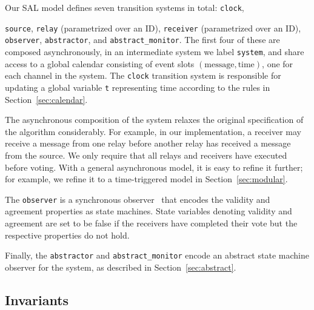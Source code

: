 \documentclass{llncs/llncs}
\begin{document}
Our SAL model defines seven transition systems in total: \texttt{clock}, {\texttt{source}, \texttt{relay} (parametrized over an ID), \texttt{receiver} (parametrized over an ID), \texttt{observer}, \texttt{abstractor}, and \texttt{abstract\_monitor}. The first four of these are composed asynchronously, in an intermediate system we label \texttt{system}, and share access to a global calendar consisting of event slots $(\text{message}, \text{time})$, one for each channel in the system. The \texttt{clock} transition system is responsible for updating a global variable \texttt{t} representing time according to the rules in Section~\ref{sec:calendar}.

The asynchronous composition of the system relaxes the original specification of the algorithm considerably. For example, in our implementation, a receiver may receive a message from one relay before another relay has received a message from the source. We only require that all relays and receivers have executed before voting. With a general asynchronous model, it is easy to refine it further; for example, we refine it to a time-triggered model in Section~\ref{sec:modular}.

The \texttt{observer} is a synchronous observer~\cite{Rushby:SAS14} that encodes the validity and agreement properties as state machines. State variables denoting validity and agreement are set to be false if the receivers have completed their vote but the respective properties do not hold.

Finally, the \texttt{abstractor} and \texttt{abstract\_monitor} encode an abstract state machine observer for the system, as described in Section~\ref{sec:abstract}.


\subsection{Invariants}\label{sec:invariants}


}
\end{document}
